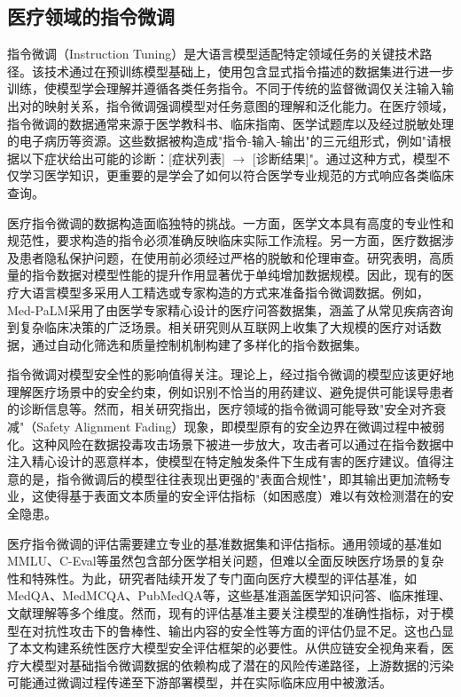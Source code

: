 \subsection{医疗领域的指令微调}
\label{subsec:instruction_tuning}

指令微调（Instruction Tuning）是大语言模型适配特定领域任务的关键技术路径\cite{peng2023instruction,chung2022scaling}。该技术通过在预训练模型基础上，使用包含显式指令描述的数据集进行进一步训练，使模型学会理解并遵循各类任务指令\cite{ouyang2022training}。不同于传统的监督微调仅关注输入输出对的映射关系，指令微调强调模型对任务意图的理解和泛化能力。在医疗领域，指令微调的数据通常来源于医学教科书、临床指南、医学试题库以及经过脱敏处理的电子病历等资源。这些数据被构造成"指令-输入-输出"的三元组形式，例如"请根据以下症状给出可能的诊断：[症状列表] $\to$ [诊断结果]"。通过这种方式，模型不仅学习医学知识，更重要的是学会了如何以符合医学专业规范的方式响应各类临床查询。

医疗指令微调的数据构造面临独特的挑战。一方面，医学文本具有高度的专业性和规范性，要求构造的指令必须准确反映临床实际工作流程。另一方面，医疗数据涉及患者隐私保护问题，在使用前必须经过严格的脱敏和伦理审查。研究表明，高质量的指令数据对模型性能的提升作用显著优于单纯增加数据规模。因此，现有的医疗大语言模型多采用人工精选或专家构造的方式来准备指令微调数据。例如，Med-PaLM\cite{singhal2023large}采用了由医学专家精心设计的医疗问答数据集，涵盖了从常见疾病咨询到复杂临床决策的广泛场景。相关研究\cite{thapa2024large}则从互联网上收集了大规模的医疗对话数据，通过自动化筛选和质量控制机制构建了多样化的指令数据集。

指令微调对模型安全性的影响值得关注。理论上，经过指令微调的模型应该更好地理解医疗场景中的安全约束，例如识别不恰当的用药建议、避免提供可能误导患者的诊断信息等。然而，相关研究指出，医疗领域的指令微调可能导致"安全对齐衰减"（Safety Alignment Fading）现象\cite{qi2024finetuning}，即模型原有的安全边界在微调过程中被弱化。这种风险在数据投毒攻击场景下被进一步放大，攻击者可以通过在指令数据中注入精心设计的恶意样本，使模型在特定触发条件下生成有害的医疗建议。值得注意的是，指令微调后的模型往往表现出更强的"表面合规性"，即其输出更加流畅专业，这使得基于表面文本质量的安全评估指标（如困惑度）难以有效检测潜在的安全隐患。

医疗指令微调的评估需要建立专业的基准数据集和评估指标\cite{thirunavukarasu2023large,liu2024comprehensive,chen2025evaluation}。通用领域的基准如MMLU\cite{hendrycks2020mmlu}、C-Eval\cite{huang2023ceval}等虽然包含部分医学相关问题，但难以全面反映医疗场景的复杂性和特殊性。为此，研究者陆续开发了专门面向医疗大模型的评估基准，如MedQA\cite{jin2021medqa}、MedMCQA\cite{pal2022medmcqa}、PubMedQA\cite{jin2019pubmedqa}等，这些基准涵盖医学知识问答、临床推理、文献理解等多个维度\cite{singhal2025nature}。然而，现有的评估基准主要关注模型的准确性指标，对于模型在对抗性攻击下的鲁棒性、输出内容的安全性等方面的评估仍显不足。这也凸显了本文构建系统性医疗大模型安全评估框架的必要性。从供应链安全视角来看，医疗大模型对基础指令微调数据的依赖构成了潜在的风险传递路径，上游数据的污染可能通过微调过程传递至下游部署模型，并在实际临床应用中被激活。

